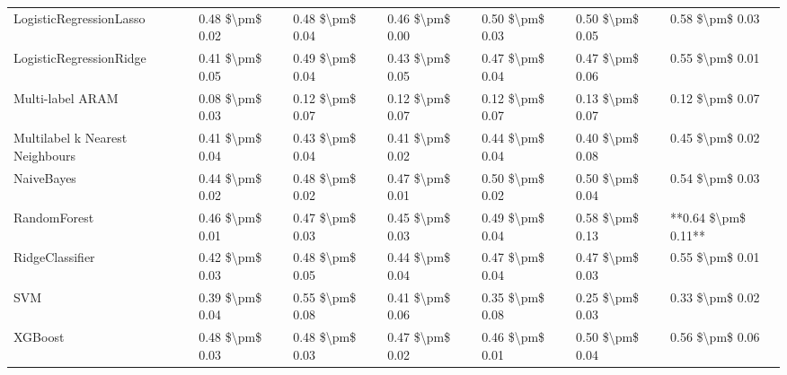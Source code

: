 \begin{tabular}{lllllll}
        LogisticRegressionLasso & 0.48 \$\textbackslash pm\$ 0.02 &           0.48 \$\textbackslash pm\$ 0.04 &       0.46 \$\textbackslash pm\$ 0.00 &        0.50 \$\textbackslash pm\$ 0.03 &                         0.50 \$\textbackslash pm\$ 0.05 &     0.58 \$\textbackslash pm\$ 0.03 \\
        LogisticRegressionRidge & 0.41 \$\textbackslash pm\$ 0.05 &           0.49 \$\textbackslash pm\$ 0.04 &       0.43 \$\textbackslash pm\$ 0.05 &        0.47 \$\textbackslash pm\$ 0.04 &                         0.47 \$\textbackslash pm\$ 0.06 &     0.55 \$\textbackslash pm\$ 0.01 \\
               Multi-label ARAM & 0.08 \$\textbackslash pm\$ 0.03 &           0.12 \$\textbackslash pm\$ 0.07 &       0.12 \$\textbackslash pm\$ 0.07 &        0.12 \$\textbackslash pm\$ 0.07 &                         0.13 \$\textbackslash pm\$ 0.07 &     0.12 \$\textbackslash pm\$ 0.07 \\
Multilabel k Nearest Neighbours & 0.41 \$\textbackslash pm\$ 0.04 &           0.43 \$\textbackslash pm\$ 0.04 &       0.41 \$\textbackslash pm\$ 0.02 &        0.44 \$\textbackslash pm\$ 0.04 &                         0.40 \$\textbackslash pm\$ 0.08 &     0.45 \$\textbackslash pm\$ 0.02 \\
                     NaiveBayes & 0.44 \$\textbackslash pm\$ 0.02 &           0.48 \$\textbackslash pm\$ 0.02 &       0.47 \$\textbackslash pm\$ 0.01 &        0.50 \$\textbackslash pm\$ 0.02 &                         0.50 \$\textbackslash pm\$ 0.04 &     0.54 \$\textbackslash pm\$ 0.03 \\
                   RandomForest & 0.46 \$\textbackslash pm\$ 0.01 &           0.47 \$\textbackslash pm\$ 0.03 &       0.45 \$\textbackslash pm\$ 0.03 &        0.49 \$\textbackslash pm\$ 0.04 &                         0.58 \$\textbackslash pm\$ 0.13 & **0.64 \$\textbackslash pm\$ 0.11** \\
                RidgeClassifier & 0.42 \$\textbackslash pm\$ 0.03 &           0.48 \$\textbackslash pm\$ 0.05 &       0.44 \$\textbackslash pm\$ 0.04 &        0.47 \$\textbackslash pm\$ 0.04 &                         0.47 \$\textbackslash pm\$ 0.03 &     0.55 \$\textbackslash pm\$ 0.01 \\
                            SVM & 0.39 \$\textbackslash pm\$ 0.04 &           0.55 \$\textbackslash pm\$ 0.08 &       0.41 \$\textbackslash pm\$ 0.06 &        0.35 \$\textbackslash pm\$ 0.08 &                         0.25 \$\textbackslash pm\$ 0.03 &     0.33 \$\textbackslash pm\$ 0.02 \\
                        XGBoost & 0.48 \$\textbackslash pm\$ 0.03 &           0.48 \$\textbackslash pm\$ 0.03 &       0.47 \$\textbackslash pm\$ 0.02 &        0.46 \$\textbackslash pm\$ 0.01 &                         0.50 \$\textbackslash pm\$ 0.04 &     0.56 \$\textbackslash pm\$ 0.06 \\
\bottomrule
\end{tabular}
